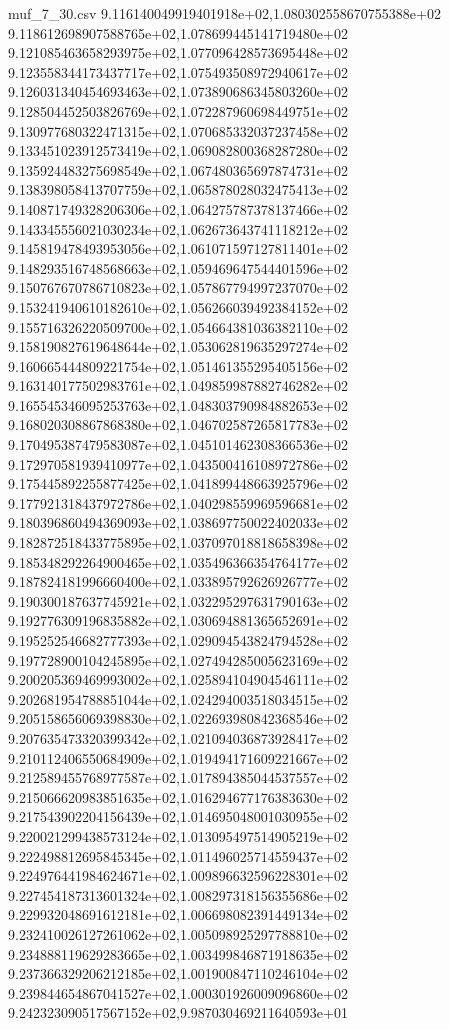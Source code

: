 \begin{filecontents*}{muf_7_30.csv}
9.116140049919401918e+02,1.080302558670755388e+02
9.118612698907588765e+02,1.078699445141719480e+02
9.121085463658293975e+02,1.077096428573695448e+02
9.123558344173437717e+02,1.075493508972940617e+02
9.126031340454693463e+02,1.073890686345803260e+02
9.128504452503826769e+02,1.072287960698449751e+02
9.130977680322471315e+02,1.070685332037237458e+02
9.133451023912573419e+02,1.069082800368287280e+02
9.135924483275698549e+02,1.067480365697874731e+02
9.138398058413707759e+02,1.065878028032475413e+02
9.140871749328206306e+02,1.064275787378137466e+02
9.143345556021030234e+02,1.062673643741118212e+02
9.145819478493953056e+02,1.061071597127811401e+02
9.148293516748568663e+02,1.059469647544401596e+02
9.150767670786710823e+02,1.057867794997237070e+02
9.153241940610182610e+02,1.056266039492384152e+02
9.155716326220509700e+02,1.054664381036382110e+02
9.158190827619648644e+02,1.053062819635297274e+02
9.160665444809221754e+02,1.051461355295405156e+02
9.163140177502983761e+02,1.049859987882746282e+02
9.165545346095253763e+02,1.048303790984882653e+02
9.168020308867868380e+02,1.046702587265817783e+02
9.170495387479583087e+02,1.045101462308366536e+02
9.172970581939410977e+02,1.043500416108972786e+02
9.175445892255877425e+02,1.041899448663925796e+02
9.177921318437972786e+02,1.040298559969596681e+02
9.180396860494369093e+02,1.038697750022402033e+02
9.182872518433775895e+02,1.037097018818658398e+02
9.185348292264900465e+02,1.035496366354764177e+02
9.187824181996660400e+02,1.033895792626926777e+02
9.190300187637745921e+02,1.032295297631790163e+02
9.192776309196835882e+02,1.030694881365652691e+02
9.195252546682777393e+02,1.029094543824794528e+02
9.197728900104245895e+02,1.027494285005623169e+02
9.200205369469993002e+02,1.025894104904546111e+02
9.202681954788851044e+02,1.024294003518034515e+02
9.205158656069398830e+02,1.022693980842368546e+02
9.207635473320399342e+02,1.021094036873928417e+02
9.210112406550684909e+02,1.019494171609221667e+02
9.212589455768977587e+02,1.017894385044537557e+02
9.215066620983851635e+02,1.016294677176383630e+02
9.217543902204156439e+02,1.014695048001030955e+02
9.220021299438573124e+02,1.013095497514905219e+02
9.222498812695845345e+02,1.011496025714559437e+02
9.224976441984624671e+02,1.009896632596228301e+02
9.227454187313601324e+02,1.008297318156355686e+02
9.229932048691612181e+02,1.006698082391449134e+02
9.232410026127261062e+02,1.005098925297788810e+02
9.234888119629283665e+02,1.003499846871918635e+02
9.237366329206212185e+02,1.001900847110246104e+02
9.239844654867041527e+02,1.000301926009096860e+02
9.242323090517567152e+02,9.987030469211640593e+01

\end{filecontents*}
